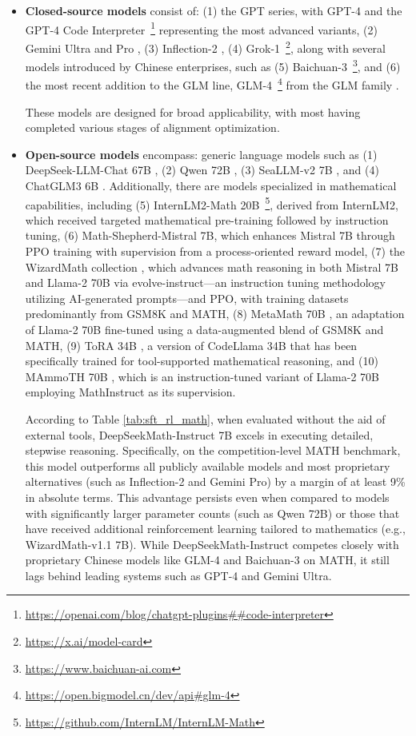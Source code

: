 \begin{itemize}[topsep=0pt]
\begin{itemize}[topsep=0pt]
    \item \textbf{Closed-source models} consist of: (1) the GPT series, with GPT-4 \citep{gpt4} and the GPT-4 Code Interpreter~\footnote{\url{https://openai.com/blog/chatgpt-plugins\#\#code-interpreter}} representing the most advanced variants, (2) Gemini Ultra and Pro \citep{gemini}, (3) Inflection-2 \citep{inflection-2}, (4) Grok-1~\footnote{\url{https://x.ai/model-card}}, along with several models introduced by Chinese enterprises, such as (5) Baichuan-3~\footnote{\url{https://www.baichuan-ai.com}}, and (6) the most recent addition to the GLM line, GLM-4~\footnote{\url{https://open.bigmodel.cn/dev/api\#glm-4}} from the GLM family \citep{glm}.

These models are designed for broad applicability, with most having completed various stages of alignment optimization.
    \item \textbf{Open-source models} encompass: generic language models such as (1) DeepSeek-LLM-Chat 67B \citep{deepseek-llm}, (2) Qwen 72B \citep{qwen}, (3) SeaLLM-v2 7B \citep{seallm}, and (4) ChatGLM3 6B \citep{chatglm3}. Additionally, there are models specialized in mathematical capabilities, including (5) InternLM2-Math 20B~\footnote{\url{https://github.com/InternLM/InternLM-Math}}, derived from InternLM2, which received targeted mathematical pre-training followed by instruction tuning, (6) Math-Shepherd-Mistral 7B, which enhances Mistral 7B \citep{mistral} through PPO training \citep{schulman2017proximal} with supervision from a process-oriented reward model, (7) the WizardMath collection \citep{wizardmath}, which advances math reasoning in both Mistral 7B and Llama-2 70B \citep{llama2} via evolve-instruct—an instruction tuning methodology utilizing AI-generated prompts—and PPO, with training datasets predominantly from GSM8K and MATH, (8) MetaMath 70B \citep{metamath}, an adaptation of Llama-2 70B fine-tuned using a data-augmented blend of GSM8K and MATH, (9) ToRA 34B \cite{tora}, a version of CodeLlama 34B that has been specifically trained for tool-supported mathematical reasoning, and (10) MAmmoTH 70B \citep{MathInstruct}, which is an instruction-tuned variant of Llama-2 70B employing MathInstruct as its supervision.

According to Table \ref{tab:sft_rl_math}, when evaluated without the aid of external tools, DeepSeekMath-Instruct 7B excels in executing detailed, stepwise reasoning. Specifically, on the competition-level MATH benchmark, this model outperforms all publicly available models and most proprietary alternatives (such as Inflection-2 and Gemini Pro) by a margin of at least 9\% in absolute terms. This advantage persists even when compared to models with significantly larger parameter counts (such as Qwen 72B) or those that have received additional reinforcement learning tailored to mathematics (e.g., WizardMath-v1.1 7B). While DeepSeekMath-Instruct competes closely with proprietary Chinese models like GLM-4 and Baichuan-3 on MATH, it still lags behind leading systems such as GPT-4 and Gemini Ultra.


\end{itemize}
\end{itemize}
